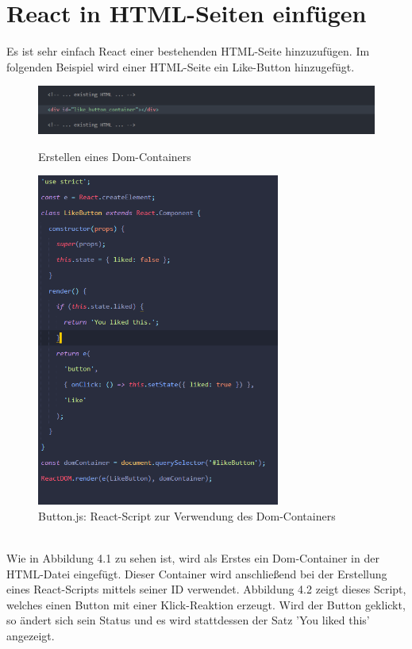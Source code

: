 \section{React in HTML-Seiten einfügen}
Es ist sehr einfach React einer bestehenden HTML-Seite hinzuzufügen. Im folgenden Beispiel wird einer HTML-Seite ein Like-Button hinzugefügt.\\
\begin{figure}[thb]
     \centerline{\includegraphics[width=14cm]{../Abbildungen/domContainer.png}}
  \caption{Erstellen eines Dom-Containers}
  \label{fig1_1}
  \vspace{1cm}
     \centerline{\includegraphics[width=8cm]{../Abbildungen/buttonScript.png}}
  \caption{Button.js: React-Script zur Verwendung des Dom-Containers}
  \label{fig1_1}
\end{figure}\\
Wie in Abbildung 4.1 zu sehen ist, wird als Erstes ein Dom-Container in der HTML-Datei eingefügt. Dieser Container wird anschließend bei der Erstellung eines React-Scripts mittels seiner ID verwendet. Abbildung 4.2 zeigt dieses Script, welches einen Button mit einer Klick-Reaktion erzeugt. Wird der Button geklickt, so ändert sich sein Status und es wird stattdessen der Satz 'You liked this' angezeigt. \\
